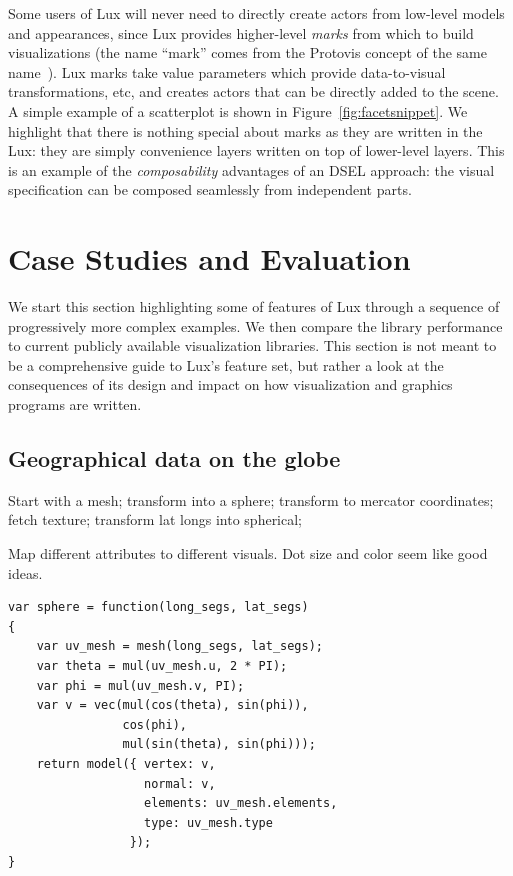 Some users of Lux will never need to directly create actors from low-level models and appearances, since Lux provides higher-level \emph{marks} from which to build visualizations (the name ``mark'' comes from the Protovis concept of the same name~\cite{Bostock:2009:PAG}). 
Lux marks take \Shade value parameters which provide data-to-visual transformations, etc, and creates actors that can be directly added to the scene. 
A simple example of a scatterplot is shown in Figure~\ref{fig:facetsnippet}. 
We highlight that there is nothing special about marks as they are written in the Lux: they are simply convenience layers written on top of lower-level layers. 
This is an example of the \emph{composability} advantages of an DSEL approach: the visual specification can be composed seamlessly from independent parts.



\section{Case Studies and Evaluation\label{sec:evaluation}}

We start this section highlighting some of features of Lux through a
sequence of progressively more complex examples. We then compare the
library performance to current publicly available visualization
libraries. This section is not meant to be a comprehensive guide to
Lux's feature set, but rather a look at the consequences of its
design and impact on how visualization and graphics programs are written.

\subsection{Geographical data on the globe}

Start with a mesh; transform into a sphere; transform to mercator
coordinates; fetch texture; transform lat longs into spherical;

Map different attributes to different visuals. Dot size and color seem
like good ideas.

\begin{verbatim}
var sphere = function(long_segs, lat_segs)
{
    var uv_mesh = mesh(long_segs, lat_segs);
    var theta = mul(uv_mesh.u, 2 * PI);
    var phi = mul(uv_mesh.v, PI);
    var v = vec(mul(cos(theta), sin(phi)),
                cos(phi),
                mul(sin(theta), sin(phi)));
    return model({ vertex: v,
                   normal: v,
                   elements: uv_mesh.elements,
                   type: uv_mesh.type
                 });
}
\end{verbatim}

